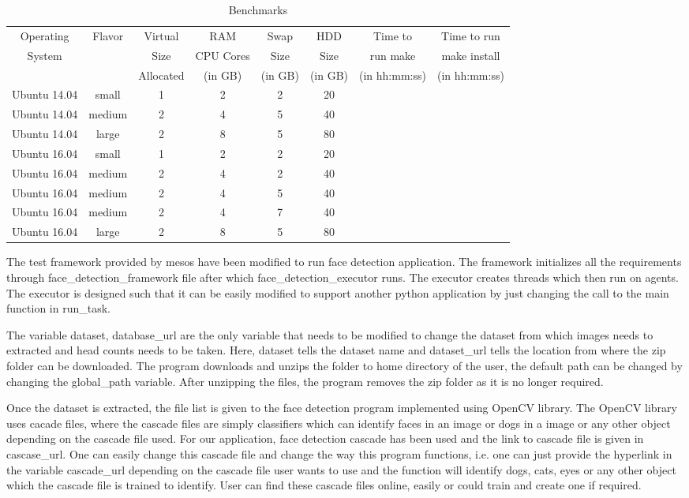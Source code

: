 \documentclass[9pt,twocolumn,twoside]{../../styles/osajnl}
\begin{document}
\begin{table}[t]
\centering
\caption{Benchmarks} 
\label{Performance comparison}
\begin{tabular}{|c|c|c|c|c|c|c|c|}
  \hline
  Operating & Flavor & Virtual & RAM & Swap & HDD & Time to & Time to run\\
  System &  & Size & CPU Cores & Size & Size & run make & make install\\
   &  & Allocated & (in GB) & (in GB) & (in GB) & (in hh:mm:ss) & (in hh:mm:ss)\\
  \hline
  Ubuntu 14.04 & small & 1 & 2 & 2 & 20 & & \\
  \hline
  Ubuntu 14.04 & medium & 2 & 4 & 5 & 40 & & \\
  \hline
  Ubuntu 14.04 & large & 2 & 8 & 5 & 80 & & \\
  \hline
  Ubuntu 16.04 & small & 1 & 2 & 2 & 20 & & \\
  \hline
  Ubuntu 16.04 & medium & 2 & 4 & 2 & 40 & & \\
  \hline
  Ubuntu 16.04 & medium & 2 & 4 & 5 & 40 & & \\
  \hline
  Ubuntu 16.04 & medium & 2 & 4 & 7 & 40 & & \\
  \hline
  Ubuntu 16.04 & large & 2 & 8 & 5 & 80 & & \\
  \hline
\end{tabular}
\end{table}
The test framework provided by mesos have been modified to run face
detection application. The framework initializes all the requirements
through face\_detection\_framework file after which
face\_detection\_executor runs. The executor creates threads which
then run on agents. The executor is designed such that it can be
easily modified to support another python application by just changing
the call to the main function in run\_task.

The variable dataset, database\_url are the only variable that needs
to be modified to change the dataset from which images needs to
extracted and head counts needs to be taken. Here, dataset tells the
dataset name and dataset\_url tells the location from where the zip
folder can be downloaded. The program downloads and unzips the folder
to home directory of the user, the default path can be changed by
changing the global\_path variable. After unzipping the files, the
program removes the zip folder as it is no longer required.

Once the dataset is extracted, the file list is given to the face
detection program implemented using OpenCV library. The OpenCV library
uses cacade files, where the cascade files are simply classifiers
which can identify faces in an image or dogs in a image or any other
object depending on the cascade file used. For our application, face
detection cascade has been used and the link to cascade file is given
in cascase\_url.  One can easily change this cascade file and change
the way this program functions, i.e. one can just provide the
hyperlink in the variable cascade\_url depending on the cascade file
user wants to use and the function will identify dogs, cats, eyes or
any other object which the cascade file is trained to identify. User
can find these cascade files online, easily or could train and create
one if required.
\end{document}
